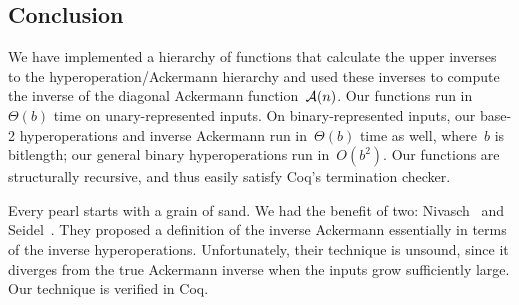 \subsection{Conclusion}
We have implemented a hierarchy of functions that calculate the upper inverses
to the hyperoperation/Ackermann hierarchy and used these inverses
to compute the inverse of the diagonal Ackermann function~$\mathcal{A}(n)$.
Our functions run in~$\Theta(b)$ time on unary-represented inputs.  On
binary-represented inputs, our \mbox{base-2} hyperoperations and inverse Ackermann
run in~$\Theta(b)$ time as well, where~$b$ is bitlength; our general binary 
hyperoperations run in~$O(b^2)$.
Our functions are structurally recursive,
and thus easily satisfy Coq's termination checker.

Every pearl starts with a grain of sand.  We had the benefit of two:
Nivasch~\cite{nivasch} and Seidel~\cite{seidel}.
They proposed a definition of the inverse Ackermann essentially in terms of
the inverse hyperoperations.  Unfortunately, their technique is unsound, since it diverges from
the true Ackermann inverse when the inputs grow sufficiently large.  Our technique is verified in Coq.








